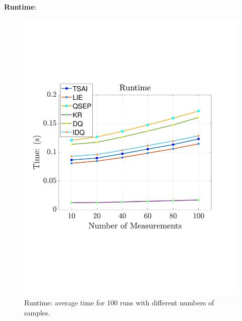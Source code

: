 \textbf{Runtime}:
\begin{figure}
\centering
\includegraphics[scale=0.4]{./hand_eye_figures/conv/conv_runtime_cmp}
\caption{Runtime: average time for 100 runs with different numbers of samples.}
\end{figure}

